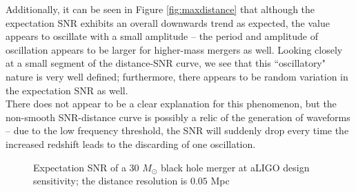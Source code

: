 \documentclass{article}
\begin{document}
Additionally, it can be seen in Figure \ref{fig:maxdistance} that although the expectation SNR exhibits an overall downwards trend as expected, the value appears to oscillate with a small amplitude -- the period and amplitude of oscillation appears to be larger for higher-mass mergers as well. Looking closely at a small segment of the distance-SNR curve, we see that this ``oscillatory" nature is very well defined; furthermore, there appears to be random variation in the expectation SNR as well. \\

There does not appear to be a clear explanation for this phenomenon, but the non-smooth SNR-distance curve is possibly a relic of the generation of waveforms -- due to the low frequency threshold, the SNR will suddenly drop every time the increased redshift leads to the discarding of one oscillation. 


\begin{figure}[!htb]
    \caption{\label{fig:label} Expectation SNR of a 30 $M_\odot$ black hole merger at aLIGO design sensitivity; the distance resolution is $0.05$ Mpc}
\end{figure}
\end{document}

